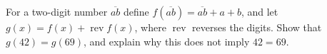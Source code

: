 For a two-digit number $\overline{ab}$ define $f(\overline{ab})=\overline{ab}+a+b$, and let $g(x)=f(x)+\operatorname{rev}f(x)$, where $\operatorname{rev}$ reverses the digits. Show that $g(42)=g(69)$, and explain why this does not imply $42=69$.
